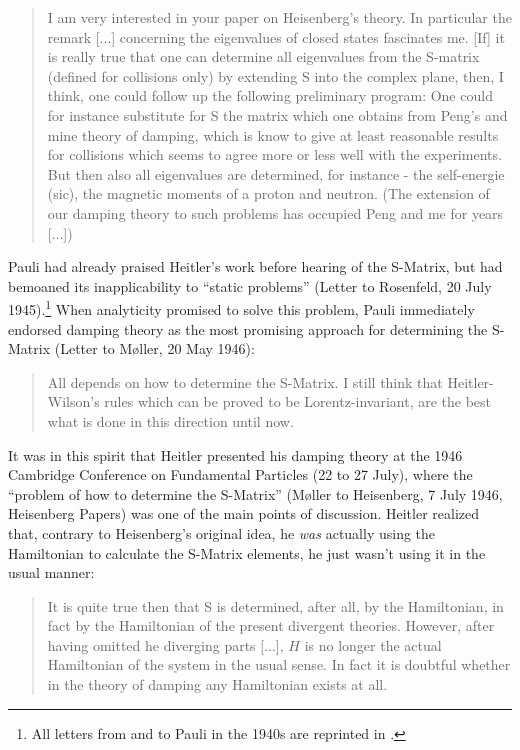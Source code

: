 \documentclass[12pt,a4paper]{article}
\begin{document}
\begin{quote}
I am very interested in your paper on Heisenberg's theory. In particular the remark [...] concerning the eigenvalues of closed states fascinates me. [If] it is really true that one can determine all eigenvalues from the S-matrix (defined for collisions only) by extending S into the complex plane, then, I think, one could follow up the following preliminary program: One could for instance substitute for S the matrix which one obtains from Peng's and mine theory of damping, which is know to give at least reasonable results for collisions which seems to agree more or less well with the experiments. But then also all eigenvalues are determined, for instance - the self-energie (sic), the magnetic moments of a proton and neutron. (The extension of our damping theory to such problems has occupied Peng and me for years [...])
\end{quote}

Pauli had already praised Heitler's work before hearing of the S-Matrix, but had bemoaned its inapplicability to ``static problems'' (Letter to Rosenfeld, 20 July 1945).\footnote{All letters from and to Pauli in the 1940s are reprinted in \cite{meyenn_1993_wissenschaftlicher}.} When analyticity promised to solve this problem, Pauli immediately endorsed damping theory as the most promising approach for determining the S-Matrix (Letter to M\o ller, 20 May 1946):

\begin{quote}
All depends on how to determine the S-Matrix. I still think that Heitler-Wilson's rules which can be proved to be Lorentz-invariant, are the best what is done in this direction until now.
\end{quote}

It was in this spirit that Heitler presented his damping theory at the 1946 Cambridge Conference on Fundamental Particles (22 to 27 July), where the ``problem of how to determine the S-Matrix'' (M\o ller to Heisenberg, 7 July 1946, Heisenberg Papers) was one of the main points of discussion. Heitler realized that, contrary to Heisenberg's original idea, he \emph{was} actually using the Hamiltonian to calculate the S-Matrix elements, he just wasn't using it in the usual manner:

\begin{quote}
It is quite true then that S is determined, after all, by the Hamiltonian, in fact by the Hamiltonian of the present divergent theories. However, after having omitted he diverging parts [...], $H$ is no longer the actual Hamiltonian of the system in the usual sense. In fact it is doubtful whether in the theory of damping any Hamiltonian exists at all. \citep[p.193]{heitler_1947_the-quantum}
\end{quote}
\end{document}
